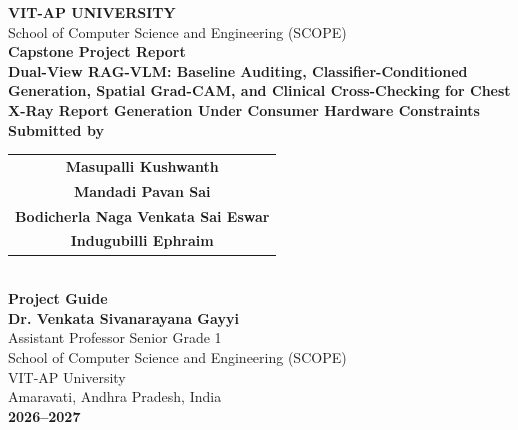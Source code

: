 \documentclass[12pt,a4paper]{report}
\begin{document}
\begin{titlepage}
    \centering
    \vspace*{0.5cm}
    
    {\Huge \textbf{VIT-AP UNIVERSITY}}\\[0.3cm]
    {\large School of Computer Science and Engineering (SCOPE)}\\[1.5cm]
    
    {\Large \textbf{Capstone Project Report}}\\[1.2cm]
    
    {\LARGE \textbf{Dual-View RAG-VLM: Baseline Auditing, Classifier-Conditioned Generation, Spatial Grad-CAM, and Clinical Cross-Checking for Chest X-Ray Report Generation Under Consumer Hardware Constraints}}\\[1.5cm]
    
    \textbf{Submitted by}\\[0.4cm]
    {\large
    \begin{tabular}{c}
        \textbf{Masupalli Kushwanth} \\
        \textbf{Mandadi Pavan Sai} \\
        \textbf{Bodicherla Naga Venkata Sai Eswar} \\
        \textbf{Indugubilli Ephraim}
    \end{tabular}
    }\\[1.5cm]
    
    \textbf{Project Guide}\\[0.4cm]
    {\large \textbf{Dr. Venkata Sivanarayana Gayyi}}\\[0.2cm]
    Assistant Professor Senior Grade 1\\
    School of Computer Science and Engineering (SCOPE)\\[1.5cm]
    
    VIT-AP University\\
    Amaravati, Andhra Pradesh, India\\[0.5cm]
    \textbf{2026--2027}
\end{titlepage}
\end{document}
